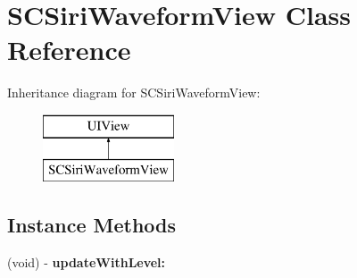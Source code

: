\hypertarget{interface_s_c_siri_waveform_view}{}\section{S\+C\+Siri\+Waveform\+View Class Reference}
\label{interface_s_c_siri_waveform_view}
Inheritance diagram for S\+C\+Siri\+Waveform\+View\+:\begin{figure}[H]
\begin{center}
\leavevmode
\includegraphics[height=2.000000cm]{interface_s_c_siri_waveform_view}
\end{center}
\end{figure}
\subsection*{Instance Methods}
\begin{DoxyCompactItemize}
\item 
\hypertarget{interface_s_c_siri_waveform_view_ad242a37479aae1ee6482f4fd068c7c3c}{}(void) -\/ {\bfseries update\+With\+Level\+:}\label{interface_s_c_siri_waveform_view_ad242a37479aae1ee6482f4fd068c7c3c}

\end{DoxyCompactItemize}
